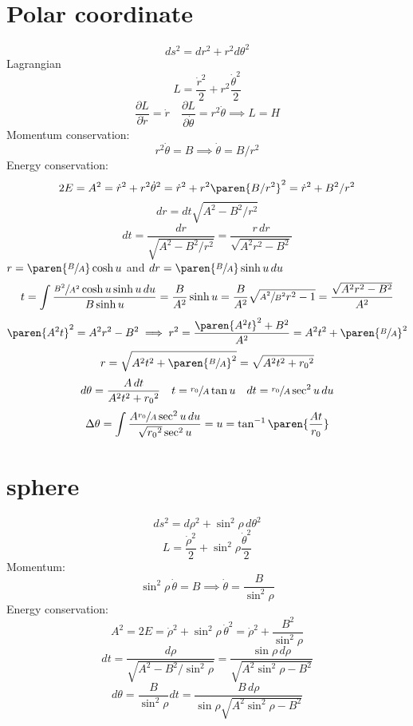 \documentclass{scrartcl}
\begin{document}
\section{Polar coordinate}
\[
  ds^2 = dr^2 + r^2 d\theta^2
\]
Lagrangian
\[
  L = \frac{\dot r^2}2 + r^2 \frac{\dot\theta^2}2
\]
\[
  \frac{\partial L}{\partial \dot r} = \dot r \quad \frac{\partial L}{\partial \dot\theta} = r^2 \dot \theta \implies L = H
\]
Momentum conservation:
\[
  r^2\dot \theta = B \implies \dot\theta = B / r^2
\]
Energy conservation:
\[
  2E=A^2 = \dot r^2 + r^2 \dot \theta^2 = \dot r^2 + r^2 \paren{B/r^2}^2  = \dot r^2 + B^2/r^2
\]
\[
  dr = dt \sqrt{A^2 - B^2/r^2}
\]
\[
  dt = \frac{dr}{\sqrt{A^2 - B^2/r^2}} = \frac{r\,dr}{\sqrt{A^2r^2 - B^2}}
\]
\(r = \paren{\sfrac{B}{A}}\cosh u\) and \(dr = \paren{\sfrac{B}{A}} \sinh u\,du \)
\[
t = \int \frac{\sfrac{B^2}{A^2}\cosh u \sinh u\, du}{B\sinh u} = \frac{B}{A^2} \sinh u = \frac{B}{A^2}\sqrt{\sfrac{A^2}{B^2}r^2 - 1 } = \frac{\sqrt{A^2r^2-B^2}}{A^2}
\]
\[
  \paren{A^2t}^2 = A^2 r^2 -B^2 \implies r^2 = \frac{\paren{A^2 t}^2 + B^2}{A^2} = A^2t^2 + \paren{\sfrac{B}{A}}^2
\]
\[
  r= \sqrt{A^2t^2 + \paren{\sfrac{B}{A}}^2} = \sqrt{A^2t^2 + {r_0}^2}
\]
\[
  d\theta = \frac{A\,dt}{A^2t^2+{r_0}^2} \quad t = \sfrac{r_0}A \tan u \quad dt = \sfrac{r_0}{A} \sec^2 u \,du
\]
\[
  \Delta\theta =  \int \frac{A \sfrac{r_0}A \sec^2u\,du }{\sqrt{{r_0}^2}\sec^2 u} = u = \tan^{-1}\paren{\frac{At}{r_0}}
\]
\section{sphere}
\[
  ds^2 = d\rho^2 + \sin^2\rho\, d\theta^2
\]
\[
  L = \frac{\dot \rho^2}{2} + \sin^2\rho \frac{\dot \theta^2}{2}
\]
Momentum:
\[
  {\sin^2\rho}\,\dot\theta = B \implies \dot\theta = \frac{B}{\sin^2\rho}
\]
Energy conservation:
\[
  A^2 = 2E = {\dot \rho^2} + {\sin^2\rho}\, {\dot \theta^2} = \dot\rho^2+ \frac{B^2}{\sin^2\rho}
\]
\[
  dt = \frac{d\rho}{\sqrt{A^2-{B^2}/{\sin^2\rho}}} = \frac{\sin\rho\, d\rho}{\sqrt{A^2\sin^2\rho - B^2}}
\]
\[
  d\theta = \frac{B}{\sin^2\rho} dt = \frac{B\, d\rho}{\sin\rho \sqrt{A^2\sin^2\rho-B^2}}
\]
\end{document}
